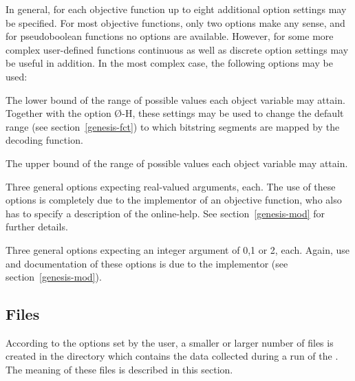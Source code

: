 In general, for each objective function up to eight additional option
settings may be specified.
For most objective functions, only two options make any sense, and for
pseudoboolean functions no options are available.
However, for some more complex user-defined functions continuous as well
as discrete option settings may be useful in addition.
In the most complex case, the following options may be used:
%
\begin{Itemize}
%
\item	{}
	The lower bound of the range of possible values each object variable
	may attain.
	Together with the option \O{-H}, these settings may be used to
	change the default range (see section~\ref{genesis-fct}) to which
	bitstring segments are mapped by the decoding function.
%
\item	{}
	The upper bound of the range of possible values each object 
	variable may attain.
%
\item	{}
	Three general options expecting real-valued arguments, each.
	The use of these options is completely due to the implementor of an
	objective function, who also has to specify a description of 
	the online-help.
	See section~\ref{genesis-mod} for further details.
%
\item	{}
	Three general options expecting an integer argument of 0,1 or 2, each.
	Again, use and documentation of these options is due to the implementor
	(see section~\ref{genesis-mod}).
%
\end{Itemize}

\subsection{Files}\label{genesis-subfiles}

According to the options set by the user, a smaller or larger number of
files is created in the directory which contains the data collected during
a run of the \GA.
The meaning of these files is described in this section.

